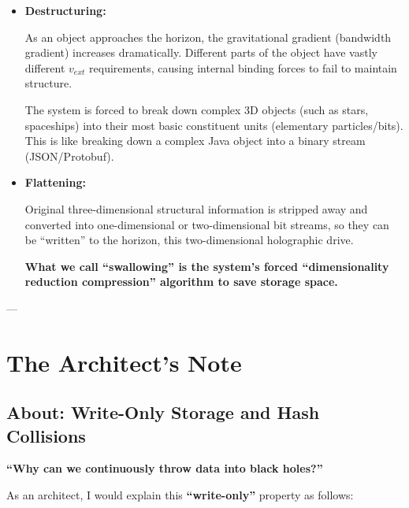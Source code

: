\documentclass[11pt,a4paper,twoside]{book}
\begin{document}
\begin{itemize}
\item \textbf{Destructuring:}

    As an object approaches the horizon, the gravitational gradient (bandwidth gradient) increases dramatically. Different parts of the object have vastly different \textbf{$v_{ext}$} requirements, causing internal binding forces to fail to maintain structure.

    The system is forced to break down complex 3D objects (such as stars, spaceships) into their most basic constituent units (elementary particles/bits). This is like breaking down a complex Java object into a binary stream (JSON/Protobuf).

\item \textbf{Flattening:}

    Original three-dimensional structural information is stripped away and converted into one-dimensional or two-dimensional bit streams, so they can be ``written'' to the horizon, this two-dimensional holographic drive.

    \textbf{What we call ``swallowing'' is the system's forced ``dimensionality reduction compression'' algorithm to save storage space.}
\end{itemize}

---

\section{The Architect's Note}

\subsection{About: Write-Only Storage and Hash Collisions}

\textbf{``Why can we continuously throw data into black holes?''}

As an architect, I would explain this \textbf{``write-only''} property as follows:
\end{document}
